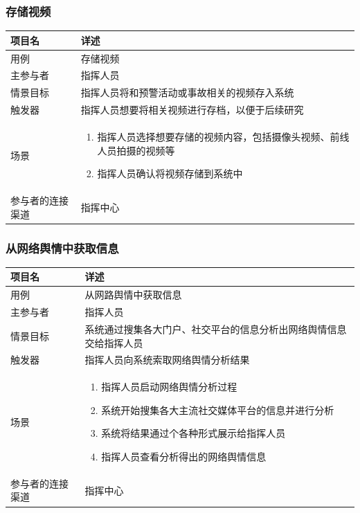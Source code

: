 \documentclass{ctexrep}
\begin{document}
\subsubsection{存储视频}
\begin{longtable}{p{2cm} | p{10cm}}
\hline
项目名 & 详述 \\
\hline
\hline
用例 & 存储视频\\
\hline
主参与者 & 指挥人员 \\
\hline
情景目标 &  指挥人员将和预警活动或事故相关的视频存入系统\\
\hline
触发器 &  指挥人员想要将相关视频进行存档，以便于后续研究\\
\hline
场景 & \begin{enumerate}
	\item 指挥人员选择想要存储的视频内容，包括摄像头视频、前线人员拍摄的视频等
	\item 指挥人员确认将视频存储到系统中
\end{enumerate} \\
\hline
参与者的连接渠道 & 指挥中心 \\
\hline
\end{longtable}

\subsubsection{从网络舆情中获取信息}
\begin{longtable}{p{2cm} | p{10cm}}
\hline
项目名 & 详述 \\
\hline
\hline
用例 & 从网路舆情中获取信息\\
\hline
主参与者 & 指挥人员 \\
\hline
情景目标 &  系统通过搜集各大门户、社交平台的信息分析出网络舆情信息交给指挥人员\\
\hline
触发器 &  指挥人员向系统索取网络舆情分析结果\\
\hline
场景 & \begin{enumerate}
	\item 指挥人员启动网络舆情分析过程
	\item 系统开始搜集各大主流社交媒体平台的信息并进行分析
	\item 系统将结果通过个各种形式展示给指挥人员
	\item 指挥人员查看分析得出的网络舆情信息
\end{enumerate} \\
\hline
参与者的连接渠道 & 指挥中心 \\
\hline
\end{longtable}
\end{document}
